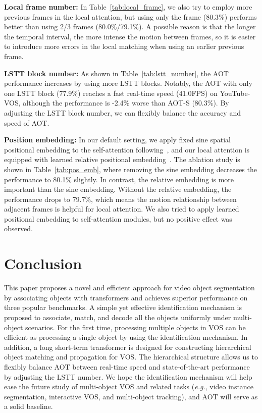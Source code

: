 \documentclass{article}
\def\eg{\emph{e.g.}}
\newcommand{\zongxin}[1]{#1}
\begin{document}
\textbf{Local frame number:} In Table~\ref{tab:local_frame}, we also try to employ more previous frames in the local attention, but using only the  frame (80.3\%) performs better than using 2/3 frames (80.0\%/79.1\%). A possible reason is that the longer the temporal interval, the more intense the motion between frames, so it is easier to introduce more errors in the local matching when using an earlier previous frame.

\textbf{LSTT block number:} As shown in Table~\ref{tab:lstt_number}, the AOT performance increases by using more LSTT blocks. Notably, the AOT with only one LSTT block (77.9\%) reaches a fast real-time speed (41.0FPS) on YouTube-VOS, although the performance is -2.4\% worse than AOT-S (80.3\%). By adjusting the LSTT block number, we can flexibly balance the accuracy and speed of AOT.

\textbf{Position embedding:} In our default setting, we apply fixed sine spatial positional embedding to the self-attention following~\cite{detr}, and our local attention is equipped with learned relative positional embedding~\cite{relativepos}. The ablation study is shown in Table~\ref{tab:pos_emb}, where removing the sine embedding decreases the performance to 80.1\% slightly. In contrast, the relative embedding is more important than the sine embedding. Without the relative embedding, the performance drops to 79.7\%, which means the motion relationship between adjacent frames is helpful for local attention. We also tried to apply learned positional embedding to self-attention modules, but no positive effect was observed.




 
\section{Conclusion}
This paper proposes a novel and efficient approach for video object segmentation by associating objects with transformers and achieves superior performance on three popular benchmarks. A simple yet effective identification mechanism is proposed to associate, match, and decode all the objects uniformly under multi-object scenarios. For the first time, processing multiple objects in VOS can be efficient as processing a single object by using the identification mechanism. In addition, a long short-term transformer is designed for constructing hierarchical object matching and propagation for VOS. The hierarchical structure allows us to flexibly balance AOT between real-time speed and state-of-the-art performance by adjusting the LSTT number. 
\zongxin{We hope the identification mechanism will help ease the future study of multi-object VOS and related tasks (\eg, video instance segmentation, interactive VOS, and multi-object tracking), and AOT will serve as a solid baseline.} 
\end{document}
